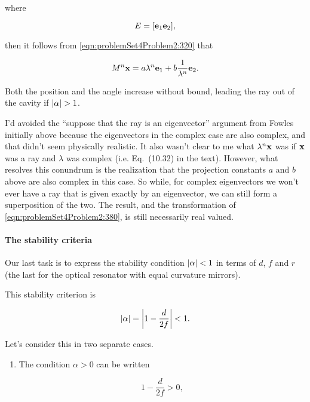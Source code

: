 {where

\begin{dmath}\label{eqn:problemSet4Problem2:360}
E = [ \Be_1 \Be_2 ],
\end{dmath}

then it follows from \ref{eqn:problemSet4Problem2:320} that

\begin{dmath}\label{eqn:problemSet4Problem2:380}
M^n \Bx = a \lambda^n \Be_1 + b \inv{\lambda^n} \Be_2.
\end{dmath}

Both the position and the angle increase without bound, leading the ray out of the cavity if ${\left\lvert{\alpha}\right\rvert} > 1$.

I'd avoided the ``suppose that the ray is an eigenvector'' argument from Fowles initially above because the eigenvectors in the complex case are also complex, and that didn't seem physically realistic.  It also wasn't clear to me what $\lambda^n \mathbf{x}$ was if $\mathbf{x}$ was a ray and $\lambda$ was complex (i.e.  Eq.~(10.32) in the text).  However, what resolves this conundrum is the realization that the projection constants $a$ and $b$ above are also complex in this case.  So while, for complex eigenvectors we won't ever have a ray that is given exactly by an eigenvector, we can still form a superposition of the two.  The result, and the transformation of \ref{eqn:problemSet4Problem2:380}, is still necessarily real valued.

\paragraph{The stability criteria}

Our last task is to express the stability condition ${\left\lvert{\alpha}\right\rvert} < 1$ in terms of $d$, $f$ and $r$ (the last for the optical resonator with equal curvature mirrors).

This stability criterion is

\begin{equation}\label{eqn:problemSet4Problem2:400}
{\left\lvert{\alpha}\right\rvert} = {\left\lvert{1 - \frac{d}{2f}}\right\rvert} < 1.
\end{equation}

Let's consider this in two separate cases.
\begin{enumerate}
\item The condition $\alpha > 0$ can be written

\begin{dmath}\label{eqn:problemSet4Problem2:420}
1 - \frac{d}{2f} > 0 ,
\end{dmath}


\end{enumerate}}
